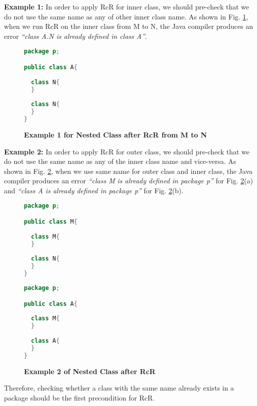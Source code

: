 \textbf{Example 1:} In order to apply RcR for inner class, we should pre-check that we do not use the same name as any of other inner class name. As shown in Fig. \ref{figure:nestedclass1}, when we run RcR on the inner class from M to N, the Java compiler produces an error \textit{``class A.N is already defined in class A''}. 

\begin{figure}[th]
\centering
\begin{minipage}[t]{0.5\linewidth}
\begin{lstlisting}[language=java, basicstyle=\scriptsize\ttfamily,frame=single]
package p;

public class A{	
    
  class N{
  }
    
  class N{
  }
} 
\end{lstlisting}
\end{minipage}
\caption{\textbf{Example 1 for Nested Class after RcR from M to N}}
\label{figure:nestedclass1}
\end{figure}

\textbf{Example 2:} In order to apply RcR for outer class, we should pre-check that we do not use the same name as any of the inner class name and vice-versa. 
As shown in Fig. \ref{figure:nestedclass2}, when we use same name for outer class and inner class, the Java compiler produces an error \textit{``class M is already defined in package p''} for Fig. \ref{figure:nestedclass2}(a) and \textit{``class A is already defined in package p''} for Fig. \ref{figure:nestedclass2}(b).

\begin{figure}[th]
\centering
\begin{minipage}[t]{0.45\linewidth}
\begin{lstlisting}[language=java, basicstyle=\scriptsize\ttfamily,frame=single]
package p;

public class M{	
  
  class M{
  }
	
  class N{
  }
} 
\end{lstlisting}
\end{minipage}
\hfill
\begin{minipage}[t]{0.45\linewidth}
\begin{lstlisting}[language=java, basicstyle=\scriptsize\ttfamily,frame=single]
package p;

public class A{	
    
  class M{
  }
    
  class A{
  }
} 
\end{lstlisting}
\end{minipage}
\caption{\textbf{Example 2 of Nested Class after RcR}}
\label{figure:nestedclass2}
\end{figure}

Therefore, checking whether a class with the same name already exists in a package should be the first precondition for RcR. 
   
